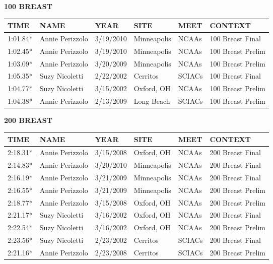 \vspace{0.4cm}

\begin{minipage}[t]{0.48\textwidth}
\centering
\textbf{100 BREAST}\\[0.05cm]
\begin{tabular}{@{}p{1.8cm}p{2.8cm}p{1.2cm}p{1.4cm}p{1.4cm}p{2.0cm}@{}}
\hline
\textbf{TIME} & \textbf{NAME} & \textbf{YEAR} & \textbf{SITE} & \textbf{MEET} & \textbf{CONTEXT} \\
\hline
1:01.84* & Annie Perizzolo & 3/19/2010 & Minneapolis & NCAAs & 100 Breast Final \\
1:02.45* & Annie Perizzolo & 3/19/2010 & Minneapolis & NCAAs & 100 Breast Prelim \\
1:03.09* & Annie Perizzolo & 3/20/2009 & Minneapolis & NCAAs & 100 Breast Prelim \\
1:05.35* & Suzy Nicoletti & 2/22/2002 & Cerritos & SCIACs & 100 Breast Final \\
1:04.77* & Suzy Nicoletti & 3/15/2002 & Oxford, OH & NCAAs & 100 Breast Prelim \\
1:04.38* & Annie Perizzolo & 2/13/2009 & Long Beach & SCIACs & 100 Breast Prelim \\
\hline
\end{tabular}
\end{minipage}\hfill
\begin{minipage}[t]{0.48\textwidth}
\centering
\textbf{200 BREAST}\\[0.05cm]
\begin{tabular}{@{}p{1.8cm}p{2.8cm}p{1.2cm}p{1.4cm}p{1.4cm}p{2.0cm}@{}}
\hline
\textbf{TIME} & \textbf{NAME} & \textbf{YEAR} & \textbf{SITE} & \textbf{MEET} & \textbf{CONTEXT} \\
\hline
2:18.31* & Annie Perizzolo & 3/15/2008 & Oxford, OH & NCAAs & 200 Breast Final \\
2:14.83* & Annie Perizzolo & 3/20/2010 & Minneapolis & NCAAs & 200 Breast Final \\
2:16.19* & Annie Perizzolo & 3/21/2009 & Minneapolis & NCAAs & 200 Breast Final \\
2:16.55* & Annie Perizzolo & 3/21/2009 & Minneapolis & NCAAs & 200 Breast Prelim \\
2:18.77* & Annie Perizzolo & 3/15/2008 & Oxford, OH & NCAAs & 200 Breast Prelim \\
2:21.17* & Suzy Nicoletti & 3/16/2002 & Oxford, OH & NCAAs & 200 Breast Final \\
2:22.54* & Suzy Nicoletti & 3/16/2002 & Oxford, OH & NCAAs & 200 Breast Prelim \\
2:23.56* & Suzy Nicoletti & 2/23/2002 & Cerritos & SCIACs & 200 Breast Final \\
2:21.16* & Annie Perizzolo & 2/23/2008 & Cerritos & SCIACs & 200 Breast Prelim \\
\hline
\end{tabular}
\end{minipage}

